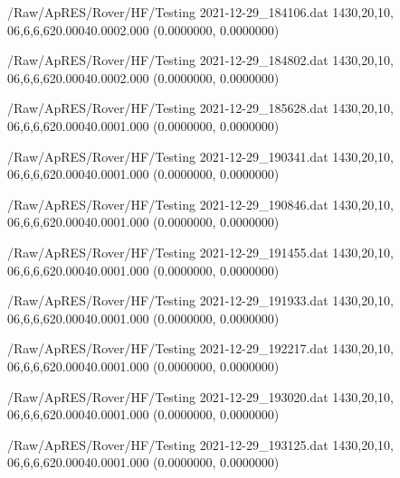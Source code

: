 \hfaprestable
{/Raw/ApRES/Rover/HF/Testing}%
{2021-12-29\_184106.dat}%
{1}{4}{30,20,10, 0}{6,6,6,6}{20.000}{40.000}{2.000}%
{ (0.0000000, 0.0000000)}%
{}%
{}%

\hfaprestable
{/Raw/ApRES/Rover/HF/Testing}%
{2021-12-29\_184802.dat}%
{1}{4}{30,20,10, 0}{6,6,6,6}{20.000}{40.000}{2.000}%
{ (0.0000000, 0.0000000)}%
{}%
{}%

\hfaprestable
{/Raw/ApRES/Rover/HF/Testing}%
{2021-12-29\_185628.dat}%
{1}{4}{30,20,10, 0}{6,6,6,6}{20.000}{40.000}{1.000}%
{ (0.0000000, 0.0000000)}%
{}%
{}%

\hfaprestable
{/Raw/ApRES/Rover/HF/Testing}%
{2021-12-29\_190341.dat}%
{1}{4}{30,20,10, 0}{6,6,6,6}{20.000}{40.000}{1.000}%
{ (0.0000000, 0.0000000)}%
{}%
{}%

\hfaprestable
{/Raw/ApRES/Rover/HF/Testing}%
{2021-12-29\_190846.dat}%
{1}{4}{30,20,10, 0}{6,6,6,6}{20.000}{40.000}{1.000}%
{ (0.0000000, 0.0000000)}%
{}%
{}%

\hfaprestable
{/Raw/ApRES/Rover/HF/Testing}%
{2021-12-29\_191455.dat}%
{1}{4}{30,20,10, 0}{6,6,6,6}{20.000}{40.000}{1.000}%
{ (0.0000000, 0.0000000)}%
{}%
{}%

\hfaprestable
{/Raw/ApRES/Rover/HF/Testing}%
{2021-12-29\_191933.dat}%
{1}{4}{30,20,10, 0}{6,6,6,6}{20.000}{40.000}{1.000}%
{ (0.0000000, 0.0000000)}%
{}%
{}%

\hfaprestable
{/Raw/ApRES/Rover/HF/Testing}%
{2021-12-29\_192217.dat}%
{1}{4}{30,20,10, 0}{6,6,6,6}{20.000}{40.000}{1.000}%
{ (0.0000000, 0.0000000)}%
{}%
{}%

\hfaprestable
{/Raw/ApRES/Rover/HF/Testing}%
{2021-12-29\_193020.dat}%
{1}{4}{30,20,10, 0}{6,6,6,6}{20.000}{40.000}{1.000}%
{ (0.0000000, 0.0000000)}%
{}%
{}%

\hfaprestable
{/Raw/ApRES/Rover/HF/Testing}%
{2021-12-29\_193125.dat}%
{1}{4}{30,20,10, 0}{6,6,6,6}{20.000}{40.000}{1.000}%
{ (0.0000000, 0.0000000)}%
{}%
{}%

